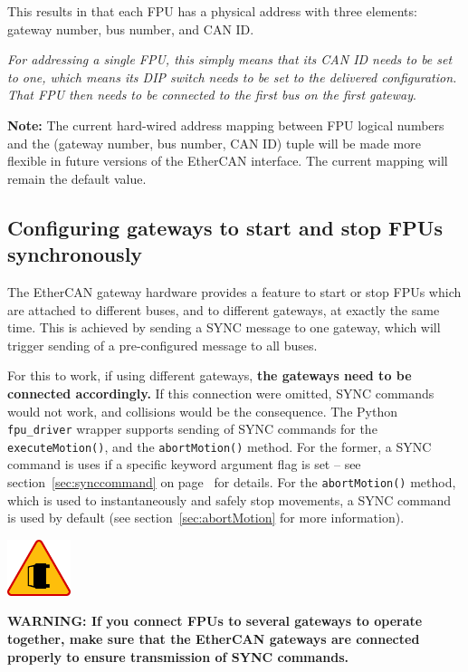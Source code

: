 \documentclass[fontsize=12,a4paper]{scrreprt}
\newenvironment{warning}{\begin{framed}\includegraphics[width=5em]{accident-area-ahead.png}
}{\end{framed}}
\begin{document}
This results in that each FPU has a physical address with three
elements: gateway number, bus number, and CAN ID.

\emph{For addressing a single FPU, this simply means that its CAN ID
  needs to be set to one, which means its DIP switch needs to be set
  to the delivered configuration. That FPU then needs to be connected
  to the first bus on the first gateway}.

\textbf{Note:} The current hard-wired address mapping between FPU
logical numbers and the (gateway number, bus number, CAN ID) tuple
will be made more flexible in future versions of the EtherCAN
interface. The current mapping will remain the default value.


\subsection{Configuring gateways to start and stop FPUs synchronously}
\label{sec:synccommand:explanation}

The EtherCAN gateway hardware provides a feature to start or stop FPUs
which are attached to different buses, and to different gateways, at
exactly the same time. This is achieved by sending a SYNC message to
one gateway, which will trigger sending of a pre-configured message to
all buses.

For this to work, if using different gateways, \textbf{the gateways
  need to be connected accordingly.} If this connection were omitted,
SYNC commands would not work, and collisions would be the
consequence. The Python \texttt{fpu\_driver} wrapper supports sending
of SYNC commands for the \texttt{executeMotion()}, and the
\texttt{abortMotion()} method. For the former, a SYNC command is uses
if a specific keyword argument flag is set -- see
section~\ref{sec:synccommand} on page~\pageref{sec:synccommand} for
details. For the \texttt{abortMotion()} method, which is used to
instantaneously and safely stop movements, a SYNC command is used by
default (see section~\ref{sec:abortMotion} for more information).

\begin{warning}
  \textbf{WARNING: If you connect FPUs to several gateways to operate
    together, make sure that the EtherCAN gateways are connected
    properly to ensure transmission of SYNC commands.}
\end{warning}
\end{document}
